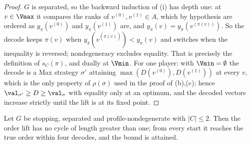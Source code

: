 \begin{proof}
$G$ is separated, so the backward induction of (i)
has depth one: at $v\in\Vmax$ it compares the ranks of $v^{(0)},v^{(1)}\in
A$, which by hypothesis are ordered as $y_\pi(v^{(0)})$ and
$y_\pi(v^{(1)})$ are, and $y_\pi(v)=y_\pi(v^{(\pi(v))})$. So the decode
keeps $\pi(v)$ when $y_\pi(v^{(\overline{\pi(v)})})<y_\pi(v)$ and switches
when the inequality is reversed; nondegeneracy excludes equality. That is
precisely the definition of $s_C(\pi)$, and dually at $\Vmin$. For one
player: with $\Vmin=\emptyset$ the decode is a Max strategy $\sigma'$
attaining $\max(D(v^{(0)}),D(v^{(1)}))$ at every $v$, which is the only
property of $\rho(\sigma)$ used in the proof of
(b),(c); hence $\val_{\sigma'}\ge D\ge\val_\sigma$
with equality only at an optimum, and the decoded vectors increase
strictly until the lift is at its fixed point.
\end{proof}

\begin{theorem}\label{ol:small-C}
Let $G$ be stopping, separated and profile-nondegenerate with $|C|\le2$.
Then the order lift has no cycle of length greater than one; from every
start it reaches the true order within four decodes, and the bound is
attained.
\end{theorem}

